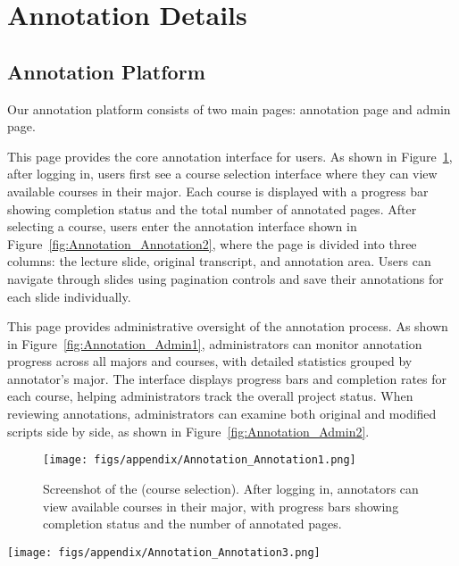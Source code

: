 \section{Annotation Details}

\subsection{Annotation Platform}
\label{sec:platform}

Our annotation platform consists of two main pages: annotation page and admin page.

\noindent
\textbf{} 
This page provides the core annotation interface for users. As shown in Figure~\ref{fig:Annotation_Annotation1}, after logging in, users first see a course selection interface where they can view available courses in their major. Each course is displayed with a progress bar showing completion status and the total number of annotated pages. After selecting a course, users enter the annotation interface shown in Figure~\ref{fig:Annotation_Annotation2}, where the page is divided into three columns: the lecture slide, original transcript, and annotation area. Users can navigate through slides using pagination controls and save their annotations for each slide individually.

\noindent
\textbf{} 
This page provides administrative oversight of the annotation process. As shown in Figure~\ref{fig:Annotation_Admin1}, administrators can monitor annotation progress across all majors and courses, with detailed statistics grouped by annotator's major. The interface displays progress bars and completion rates for each course, helping administrators track the overall project status. When reviewing annotations, administrators can examine both original and modified scripts side by side, as shown in Figure~\ref{fig:Annotation_Admin2}.

\begin{figure}[t]
    \centering
    \texttt{[image: figs/appendix/Annotation\_Annotation1.png]}
    \caption{Screenshot of the  (course selection). After logging in, annotators can view available courses in their major, with progress bars showing completion status and the number of annotated pages.}
    \label{fig:Annotation_Annotation1}
\end{figure}

\begin{figure*}[htbp]
    \centering
    \texttt{[image: figs/appendix/Annotation\_Annotation3.png]}
    \caption{Screenshot of the  (annotation). The page displays the lecture slide (left), original transcript (middle), and annotation area (right). Users can modify transcripts while viewing the corresponding slides and track their annotation status.}
    \label{fig:Annotation_Annotation2}
\end{figure*}

